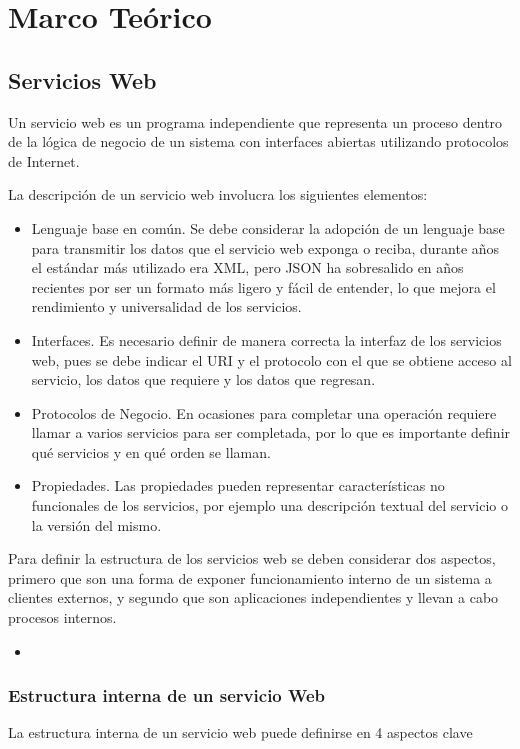 \chapter{ Marco Teórico }

\section{ Servicios Web }
Un servicio web es un programa independiente que representa un proceso dentro de la lógica de negocio de un sistema con interfaces abiertas utilizando protocolos de Internet.

La descripción de un servicio web involucra los siguientes elementos:

\begin{itemize}
\item Lenguaje base en común. Se debe considerar la adopción de un lenguaje base para transmitir los datos que el servicio web exponga o reciba, durante años el estándar más utilizado era XML, pero JSON ha sobresalido en años recientes por ser un formato más ligero y fácil de entender, lo que mejora el rendimiento y universalidad de los servicios.
\item  Interfaces. Es necesario definir de manera correcta la interfaz de los servicios web, pues se debe indicar el URI y el protocolo con el que se obtiene acceso al servicio, los datos que requiere y los datos que regresan.
\item Protocolos de Negocio. En ocasiones para completar una operación requiere llamar a varios servicios para ser completada, por lo que es importante definir qué servicios y en qué orden se llaman.
\item Propiedades. Las propiedades pueden representar características no funcionales de los servicios, por ejemplo una descripción textual del servicio o la versión del mismo.
\end{itemize}


Para definir la estructura de los servicios web se deben considerar dos aspectos, primero que son una forma de exponer funcionamiento interno de un sistema a clientes externos, y segundo que son aplicaciones independientes y llevan a cabo procesos internos.
\begin{itemize}
\item 
\end{itemize}

\subsection{ Estructura interna de un servicio Web }
La estructura interna de un servicio web puede definirse en 4 aspectos clave 


